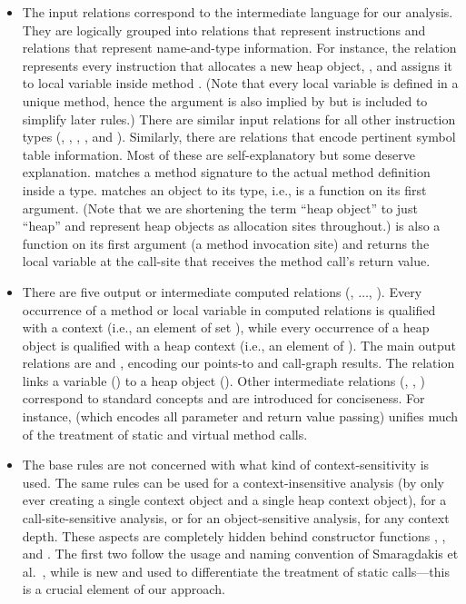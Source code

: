 \begin{itemize}
\item The input relations correspond to the intermediate language for
  our analysis. They are logically grouped into relations that
  represent instructions and relations that represent name-and-type
  information. For instance, the  relation represents
  every instruction that allocates a new heap object, , and
  assigns it to local variable  inside method
  . (Note that every local variable is defined in a
  unique method, hence the  argument is also implied by
   but is included to simplify later rules.) There are similar
  input relations for all other instruction types (,
  , , , and
  ). Similarly, there are relations that encode
  pertinent symbol table information.  Most of these are
  self-explanatory but some deserve explanation. 
  matches a method signature to the actual method definition inside a
  type.  matches an object to its type, i.e., is a
  function on its first argument. (Note that we are shortening the
  term ``heap object'' to just ``heap'' and represent heap objects as
  allocation sites throughout.)  is also a
  function on its first argument (a method invocation site) and
  returns the local variable at the call-site that receives the method
  call's return value.
  
\item There are five output or intermediate computed relations
  (, $\ldots$, ). Every
  occurrence of a method or local variable in computed relations is
  qualified with a context (i.e., an element of set ), while
  every occurrence of a heap object is qualified with a heap context
  (i.e., an element of ). The main output relations are
   and , encoding our
  points-to and call-graph results. The 
  relation links a variable () to a heap object
  (). Other intermediate relations (,
  , ) correspond to
  standard concepts and are introduced for conciseness. For instance,
   (which encodes all parameter and return
  value passing) unifies much of the treatment of static and virtual
  method calls.

\item The base rules are not concerned with what kind of
  context-sensitivity is used. The same rules can be used for a
  context-insensitive analysis (by only ever creating a single context
  object and a single heap context object), for a call-site-sensitive
  analysis, or for an object-sensitive analysis, for any context
  depth. These aspects are completely hidden behind constructor
  functions , , and
  . The first two follow the usage and naming
  convention of Smaragdakis et al.~\cite{pointsto-popl11}, while
   is new and used to differentiate the
  treatment of static calls---this is a crucial element of our approach.


\end{itemize}
